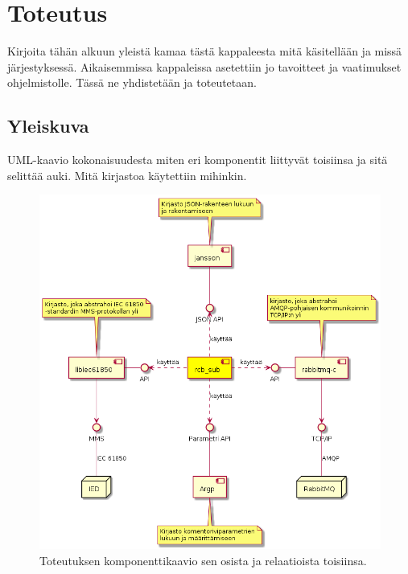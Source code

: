 \chapter{Toteutus}
\label{ch:toteutus}
\begin{it}
	Kirjoita tähän alkuun yleistä kamaa tästä kappaleesta mitä käsitellään ja missä järjestyksessä. Aikaisemmissa kappaleissa asetettiin jo tavoitteet ja vaatimukset ohjelmistolle. Tässä ne yhdistetään ja toteutetaan.
\end{it}


\section{Yleiskuva}
\begin{it}
	UML-kaavio kokonaisuudesta miten eri komponentit liittyvät toisiinsa ja sitä selittää auki. Mitä kirjastoa käytettiin mihinkin.
\end{it}

\begin{figure}[ht!]
	\includegraphics[width=1\textwidth]{pictures/rcb-sub-component-diagram.png}
	\caption{Toteutuksen komponenttikaavio sen osista ja relaatioista toisiinsa.}
	\label{fig:rcb-sub-komponenttikaavio}
\end{figure}



